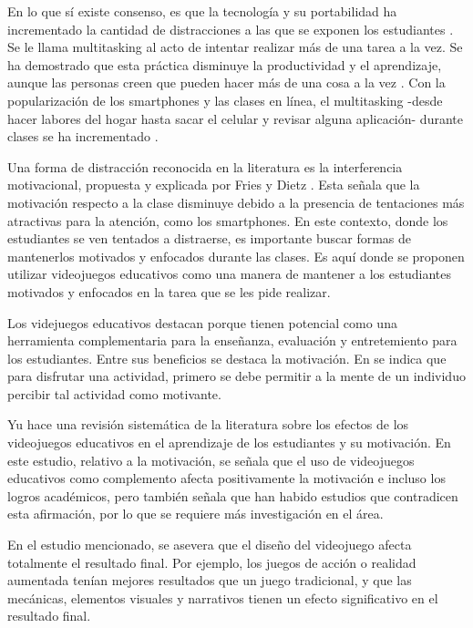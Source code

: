 En lo que sí existe consenso, es que la tecnología y su portabilidad ha incrementado la cantidad de distracciones a las que se exponen
los estudiantes \cite{Zimmerman2011HandbookOS, Wang2022ComprehensivelySummarizeDistractions}. Se le llama multitasking al acto de intentar realizar más de una tarea a la vez. Se ha demostrado que esta práctica disminuye la productividad y el aprendizaje, aunque las personas creen que pueden hacer más de una cosa a la vez \cite{Domoff2019AddictivePU}.  Con la popularización de los smartphones y las clases en línea, el multitasking -desde hacer labores del hogar hasta sacar el celular y revisar alguna aplicación- durante clases se ha incrementado \cite{Wang2022ComprehensivelySummarizeDistractions}.

Una forma de distracción reconocida en la literatura es la interferencia motivacional, propuesta y explicada por Fries y Dietz \cite{Fries2007LearningMotivationalInterference}. Esta señala que la motivación respecto a la clase disminuye debido a la presencia de tentaciones más atractivas para la atención, como los smartphones. En este contexto, donde los estudiantes se ven tentados a distraerse, es importante buscar formas de mantenerlos motivados y enfocados durante las clases. Es aquí donde se proponen utilizar videojuegos educativos como una manera de mantener a los estudiantes motivados y enfocados en la tarea que se les pide realizar.

Los videjuegos educativos destacan porque tienen potencial como una herramienta complementaria para la enseñanza, evaluación y entretemiento para los estudiantes. Entre sus beneficios se destaca la motivación. En \cite{Bisson1996FunInLEarningPedagogicalRole} se indica que para disfrutar una actividad, primero se debe permitir a la mente de un individuo percibir tal actividad como motivante. 

Yu hace una revisión sistemática de la literatura \cite{Yu2020TheEffectsOfEducationGames} sobre los efectos de los videojuegos educativos en el aprendizaje de los estudiantes y su motivación. En este estudio, relativo a la motivación, se señala que el uso de videojuegos educativos como complemento afecta positivamente la motivación e incluso los logros académicos, pero también señala que han habido estudios que contradicen esta afirmación, por lo que se requiere más investigación en el área.

En el estudio mencionado, se asevera que el diseño del videojuego afecta totalmente el resultado final. Por ejemplo, los juegos de acción o realidad aumentada tenían mejores resultados que un juego tradicional, y que las mecánicas, elementos visuales y narrativos tienen un efecto significativo en el resultado final.

